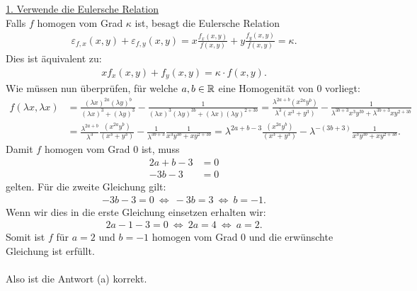 \underline{1. Verwende die Eulersche Relation}\\
Falls $ f $ homogen vom Grad $ \kappa $ ist, besagt die Eulersche Relation
\begin{align*}
	\varepsilon_{f,x}(x,y) + \varepsilon_{f,y}(x,y) 
	= x \frac{f_x(x,y)}{f(x,y)} + y \frac{f_y(x,y)}{f(x,y)}
	= \kappa.
\end{align*}
Dies ist äquivalent zu:
\begin{align*}
	x f_x(x,y) + f_y(x,y) = \kappa \cdot f(x,y).
\end{align*}
Wie müssen nun überprüfen, für welche $ a, b\in \mathbb{R} $ eine Homogenität von $ 0 $ vorliegt:
\begin{align*}
	f(\lambda x, \lambda x)
	&=
	\frac{(\lambda x)^{2a} (\lambda y)^b}{(\lambda x)^3 +(\lambda y)^3}
	- 
	\frac{1}{(\lambda x)^3 (\lambda y)^{3b} + (\lambda x) (\lambda y)^{2 + 3b}}
	=
	\frac{\lambda^{2a +b} ( x^{2a}  y^b)}{\lambda^3 (x^3 + y^3 )}
	- 
	\frac{1}{\lambda^{3b + 3} x^3  y^{3b} + \lambda^{3b + 3} x  y^{2 + 3b}}\\
	&=
	\frac{\lambda^{2a +b}}{\lambda^3}\frac{ ( x^{2a}  y^b)}{ (x^3 + y^3 )}
	- 
	\frac{1}{\lambda^{3b + 3}}\frac{1}{ x^3  y^{3b} +  x  y^{2 + 3b}}
	=
		\lambda^{2a +b - 3}\frac{ ( x^{2a}  y^b)}{ (x^3 + y^3 )}
	- 
	\lambda^{-(3b + 3)}\frac{1}{ x^3  y^{3b} +  x  y^{2 + 3b}}.
\end{align*}
Damit $ f $ homogen vom Grad $ 0 $ ist, muss 
\begin{align*}
	2a + b - 3 &= 0\\
	-3b - 3 &= 0
\end{align*}
gelten. Für die zweite Gleichung gilt:
\begin{align*}
	-3b - 3 = 0 
	\ \Leftrightarrow \
	-3b = 3
	\ \Leftrightarrow \
	b = -1.
\end{align*}
Wenn wir dies in die erste Gleichung einsetzen erhalten wir:
\begin{align*}
	2a - 1 - 3 = 0 
	\ \Leftrightarrow \
	2a = 4
	\ \Leftrightarrow \
	a = 2.
\end{align*}
Somit ist $ f $ für $ a = 2 $ und $ b= -1 $ homogen vom Grad $ 0 $ und die erwünschte Gleichung ist erfüllt.\\
\\
Also ist die Antwort (a) korrekt.


